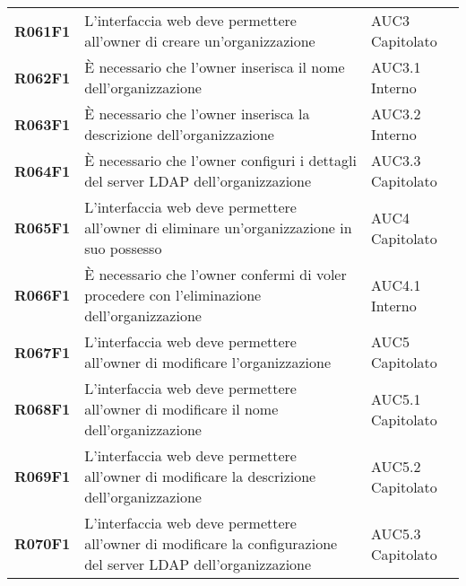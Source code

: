 \documentclass[../analisi-dei-requisiti.tex]{subfiles}
\begin{document}
\begin{longtable}[H]{>{\centering\bfseries}m{3cm} >{\centering}m{10cm} >{\centering\arraybackslash}m{3cm}}
  R061F1                               & L'interfaccia web deve permettere all'owner di creare un'organizzazione                                                                                                                                 & AUC3 Capitolato               \\
  R062F1                               & È necessario che l'owner inserisca il nome dell'organizzazione                                                                                                                                          & AUC3.1 Interno                \\
  R063F1                               & È necessario che l'owner inserisca la descrizione dell'organizzazione                                                                                                                                   & AUC3.2 Interno                \\
  R064F1                               & È necessario che l'owner configuri i dettagli del server LDAP dell'organizzazione                                                                                                                       & AUC3.3 Capitolato             \\
  R065F1                               & L'interfaccia web deve permettere all'owner di eliminare un'organizzazione in suo possesso                                                                                                              & AUC4 Capitolato               \\
  R066F1                               & È necessario che l'owner confermi di voler procedere con l'eliminazione dell'organizzazione                                                                                                             & AUC4.1 Interno                \\
  R067F1                               & L'interfaccia web deve permettere all'owner di modificare l'organizzazione                                                                                                                              & AUC5 Capitolato               \\
  R068F1                               & L'interfaccia web deve permettere all'owner di modificare il nome dell'organizzazione                                                                                                                   & AUC5.1 Capitolato             \\
  R069F1                               & L'interfaccia web deve permettere all'owner di modificare la descrizione dell'organizzazione                                                                                                            & AUC5.2 Capitolato             \\
  R070F1                               & L'interfaccia web deve permettere all'owner di modificare la configurazione del server LDAP dell'organizzazione                                                                                         & AUC5.3 Capitolato             \\


\end{longtable}
\end{document}
